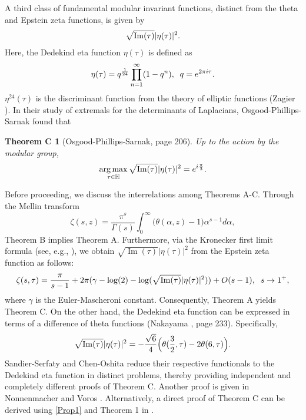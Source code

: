 \documentclass[reqno,english]{amsart}
\newtheorem*{thmC}{Theorem C}
\newtheorem{open problem}{Open Problem}[section]
\newtheorem{open question}{Open Question}[section]
\newtheorem{open questions on hexagonal lattice}{Open Questions on hexagonal lattice}[section]
\renewcommand{\Im}{\operatorname{Im}}
\DeclareMathOperator*{\argmax}{arg\,max}
\begin{document}
A third class of fundamental modular invariant functions, distinct from the theta and Epstein zeta functions, is given by
\begin{equation}\aligned\label{eta}
{\sqrt{\Im(\tau)}|\eta(\tau)|^2}.
\endaligned\end{equation}
Here, the Dedekind eta function $\eta(\tau)$ is defined as
\begin{equation}\aligned\nonumber
\eta(\tau)=q^{\frac{1}{24}}\prod_{n=1}^\infty (1-q^n),\;\; q=e^{2\pi i\tau}.
\endaligned\end{equation}
$\eta^{24}(\tau)$ is the discriminant function from the theory of elliptic functions (Zagier \cite{Zagier}).
In their study of extremals for the determinants of Laplacians, Osgood-Phillips-Sarnak \cite{Sarnak1988} found that
\begin{thmC}[Osgood-Phillips-Sarnak, page 206]\label{Sarnak}
Up to the action by the modular group,
 \begin{equation}\aligned\nonumber
\argmax_{\tau\in\mathbb{H}}\sqrt{\Im(\tau)}|\eta(\tau)|^2=e^{i\frac{\pi}{3}}.
\endaligned\end{equation}
\end{thmC}

Before proceeding, we discuss the interrelations among Theorems A-C.
Through the Mellin transform
$$
\zeta(s,z)=\frac{\pi^s}{\Gamma(s)}\int_0^\infty \big(\theta(\alpha,z)-1\big)\alpha^{s-1}d\alpha,
$$
Theorem B implies Theorem A. Furthermore, via the Kronecker first limit formula (see, e.g., \cite{Cohen2007}), we obtain
${\sqrt{\Im(\tau)}|\eta(\tau)|^2}$ from the Epstein zeta function as follows:
 \begin{equation}\aligned
 \zeta(s,\tau)={\pi  \over s-1}+2\pi (\gamma -\log(2)-\log({\sqrt {\Im(\tau)}}|\eta (\tau )|^{2}))+O(s-1), \;\;s\rightarrow 1^+,
\endaligned\end{equation}
where $\gamma$ is the Euler-Mascheroni constant. Consequently, Theorem A yields Theorem C. On the other hand, the Dedekind eta function can be expressed in terms of a difference of theta functions (Nakayama \cite{Naka2004}, page 233). Specifically,
\begin{equation}\aligned\label{Prop1}
\sqrt{\Im(\tau)}|\eta(\tau)|^2=-\frac{\sqrt6}{4}\Big(\theta(\frac{3}{2},\tau)-2\theta(6,\tau)\Big).
\endaligned\end{equation}
Sandier-Serfaty \cite{Serfaty2012} and Chen-Oshita \cite{Che2007} reduce their respective functionals to the Dedekind eta function in distinct problems, thereby providing independent and completely different proofs of Theorem C. Another proof is given in Nonnenmacher and Voros \cite{Non1998}. Alternatively, a direct proof of Theorem C can be derived using \eqref{Prop1} and Theorem 1 in \cite{LW2023}.
\end{document}
